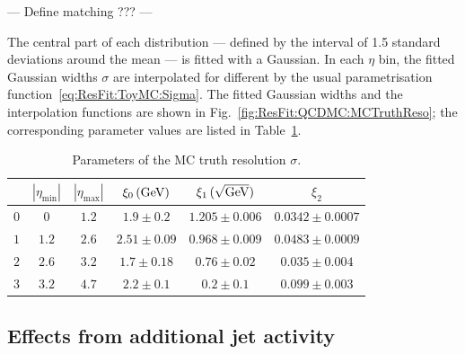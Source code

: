 --- Define matching ??? ---

The central part of each distribution --- defined by the interval of 1.5 standard deviations around the mean --- is fitted with a Gaussian.
In each $\eta$ bin, the fitted Gaussian widths $\sigma$ are interpolated for different \pt by the usual parametrisation function~\eqref{eq:ResFit:ToyMC:Sigma}.
The fitted Gaussian widths and the interpolation functions are shown in Fig.~\ref{fig:ResFit:QCDMC:MCTruthReso}; the corresponding parameter values are listed in Table~\ref{tab:ResFit:QCDMC:MCTruthReso}.
\begin{table}[ht]
  \caption{Parameters of the MC truth resolution $\sigma$.}
  \centering
  \begin{tabular}[h]{cccccc}
    \toprule
    & $|\eta_{\text{min}}|$ & $|\eta_{\text{max}}|$ & $\xi_{0}\,(\text{Ge}\kern-0.06667em\text{V})$ & $\xi_{1}\,(\sqrt{\text{Ge}\kern-0.06667em\text{V}})$ & $\xi_{2}$ \\
    \midrule
    $0$ & $0$ & $1.2$ & $1.9\pm0.2$ & $1.205\pm0.006$  & $0.0342\pm0.0007$ \\
    $1$ & $1.2$ & $2.6$ & $2.51\pm0.09$ & $0.968\pm0.009$  & $0.0483\pm0.0009$ \\
    $2$ & $2.6$ & $3.2$ & $1.7\pm0.18$ & $0.76\pm0.02$  & $0.035\pm0.004$ \\
    $3$ & $3.2$ & $4.7$ & $2.2\pm0.1$ & $0.2\pm0.1$  & $0.099\pm0.003$ \\
    \bottomrule
  \end{tabular}
  \label{tab:ResFit:QCDMC:MCTruthReso}
\end{table}




\subsection{Effects from additional jet activity}\label{sec:ResFit:QCDMC:AddJetAct}

